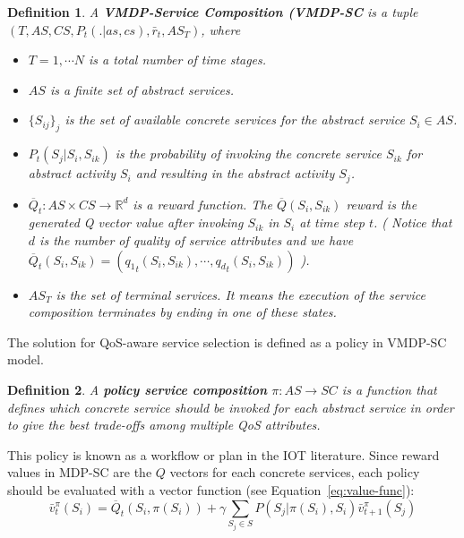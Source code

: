 \documentclass[10pt,journal,compsoc]{IEEEtran}
\newtheorem{definition}{Definition}
\begin{document}
\begin{definition}
A \textbf{VMDP-Service Composition (VMDP-SC} is a tuple $(T, AS, CS, P_t(.|as,cs), \bar{r}_t, AS_T)$, where  

\begin{itemize}
\item[ -] $T= 1, \cdots N$ is a total number of time stages. 
\item[-] $AS$ is a finite set of abstract services.
\item[-] $\{S_{ij}\}_j$ is the set of available concrete services for the abstract service $S_i \in AS$.
\item[-] $P_t(S_j | S_i, S_{ik} )$ is the probability of invoking the concrete service $S_{ik}$ for abstract activity $S_i$ and resulting in the abstract activity $S_j$.
\item[-] $ \overline{Q}_t: AS \times CS \longrightarrow \mathbb{R}^d$ is a reward function. The $\overline{Q}(S_i, S_{ik})$ reward is the generated Q vector value after invoking $S_{ik}$ in $S_i$ at time step $t$. ( Notice that $d$ is the number of quality of service attributes and we have $\overline{Q}_t(S_i, S_{ik}) = ({q_1}_t(S_i, S_{ik}), \cdots, {q_d}_t(S_i, S_{ik}))$ ). 
\item[-] $AS_T$ is the set of terminal services. It means the execution of the service composition terminates by ending in one of these states.
\end{itemize}
\label{def:vmdp-sc}
\end{definition}

The solution for QoS-aware service selection is defined as a policy in VMDP-SC model.

\begin{definition}
A \textbf{policy service composition} $\pi: AS \longrightarrow SC$ is a function that defines which concrete service should be invoked for each abstract service in order to give the best trade-offs among multiple QoS attributes. 
\end{definition}

This policy is known as a workflow or plan in the IOT literature. Since reward values in MDP-SC are the $Q$ vectors for each concrete services, each policy should be evaluated with a vector function (see Equation~\ref{eq:value-func}):
\begin{equation}
\bar{v}_t^{\pi}(S_i) = \overline{Q}_t(S_i, \pi(S_i)) + \gamma \sum_{S_j \in S} P(S_j | \pi(S_i), S_i) \bar{v}_{t+1}^{\pi}(S_j)
\end{equation}
\end{document}
